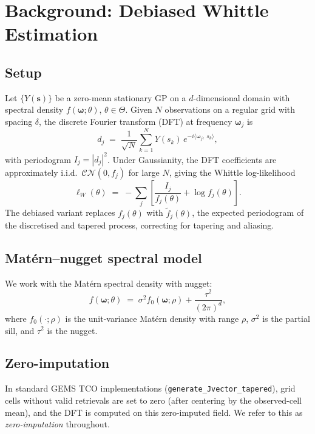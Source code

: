 \documentclass[12pt]{article}
\begin{document}
\section{Background: Debiased Whittle Estimation}
\label{sec:background}

\subsection{Setup}

Let $\{Y(\mathbf{s})\}$ be a zero-mean stationary GP on a $d$-dimensional
domain with spectral density $f(\boldsymbol{\omega};\theta)$,
$\theta\in\Theta$.  Given $N$ observations on a regular grid with spacing
$\delta$, the discrete Fourier transform (DFT) at frequency
$\boldsymbol{\omega}_j$ is
\[
    d_j \;=\; \frac{1}{\sqrt{N}}\sum_{k=1}^N Y(s_k)\,
                e^{-i\langle\boldsymbol{\omega}_j,\,s_k\rangle},
\]
with periodogram $I_j = |d_j|^2$.
Under Gaussianity, the DFT coefficients are approximately i.i.d.\
$\mathcal{CN}(0, f_j)$ for large $N$, giving the Whittle log-likelihood
\[
    \ell_W(\theta) \;=\; -\sum_j \left[
        \frac{I_j}{f_j(\theta)} + \log f_j(\theta)
    \right].
\]
The debiased variant \citep{Sykulski2019} replaces $f_j(\theta)$ with
$\tilde{f}_j(\theta)$, the expected periodogram of the discretised and
tapered process, correcting for tapering and aliasing.

\subsection{Matérn--nugget spectral model}

We work with the Matérn spectral density with nugget:
\[
  f(\boldsymbol{\omega};\theta)
  \;=\; \sigma^2 f_0(\boldsymbol{\omega};\rho)
        + \frac{\tau^2}{(2\pi)^d},
\]
where $f_0(\cdot;\rho)$ is the unit-variance Matérn density with range
$\rho$, $\sigma^2$ is the partial sill, and $\tau^2$ is the nugget.

\subsection{Zero-imputation}

In standard GEMS TCO implementations (\texttt{generate\_Jvector\_tapered}),
grid cells without valid retrievals are set to zero (after centering by
the observed-cell mean), and the DFT is computed on this zero-imputed field.
We refer to this as \emph{zero-imputation} throughout.
\end{document}
